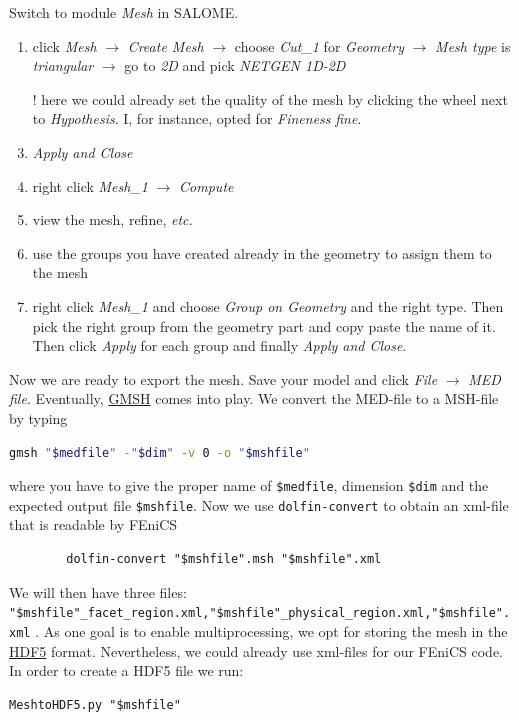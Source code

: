 \documentclass{article}
\begin{document}
Switch to module \textit{Mesh} in SALOME.
\begin{enumerate}
\item click \textit{Mesh} $\rightarrow$ \textit{Create Mesh} $\rightarrow$ choose \textit{Cut\_1} for \textit{Geometry}
$\rightarrow$ \textit{Mesh type} is \textit{triangular} $\rightarrow$  go to \textit{2D} and pick \textit{NETGEN 1D-2D}
\item[!] here we could already set the quality of the mesh by clicking the wheel next to \textit{Hypothesis}. I, for instance, opted for \textit{Fineness} \textit{fine}.
\item \textit{Apply and Close}
\item right click  \textit{Mesh\_1} $\rightarrow$ \textit{Compute}
\item view the mesh, refine, \textit{etc.}
\item use the groups you have created already in the geometry to assign them to the mesh
\item right click \textit{Mesh\_1} and choose \textit{Group on Geometry} and the right type. Then pick the right group from the geometry part and copy paste the name of it. Then click \textit{Apply} for each group and finally \textit{Apply and Close}.
\end{enumerate}
Now we are ready to export the mesh.
Save your model and click \textit{File} $\rightarrow$ \textit{MED file}.
Eventually, \href{http://gmsh.info/}{GMSH} comes into play.
We convert the MED-file to a MSH-file by typing
\begin{lstlisting}[language=bash]
        gmsh "$medfile" -"$dim" -v 0 -o "$mshfile"
\end{lstlisting}
where you have to give the proper name of \lstinline{$medfile}, dimension \lstinline{$dim} and the expected output file \lstinline{$mshfile}.
Now we use \lstinline{dolfin-convert} to obtain an xml-file that is readable by FEniCS
\begin{lstlisting}
        dolfin-convert "$mshfile".msh "$mshfile".xml
\end{lstlisting}
We will then have three files:\\
\lstinline{"$mshfile"_facet_region.xml,"$mshfile"_physical_region.xml,"$mshfile".xml} .
As one goal is to enable multiprocessing, we opt for storing the mesh in the \href{https://en.wikipedia.org/wiki/Hierarchical_Data_Format}{HDF5} format. 
Nevertheless, we could already use xml-files for our FEniCS code.
In order to create a HDF5 file we run:
\begin{lstlisting}
MeshtoHDF5.py "$mshfile"
\end{lstlisting}
\end{document}
